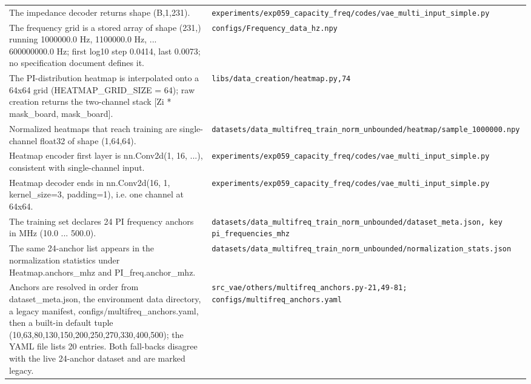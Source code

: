 \begin{longtable}{p{} p{}}
The impedance decoder returns shape (B,1,231). & \texttt{experiments/\allowbreak{}exp059\_\allowbreak{}capacity\_\allowbreak{}freq/\allowbreak{}codes/\allowbreak{}vae\_\allowbreak{}multi\_\allowbreak{}input\_\allowbreak{}simple.py} \\
The frequency grid is a stored array of shape (231,) running 1000000.0 Hz, 1100000.0 Hz, ... 600000000.0 Hz; first log10 step 0.0414, last 0.0073; no specification document defines it. & \texttt{configs/\allowbreak{}Frequency\_\allowbreak{}data\_\allowbreak{}hz.npy} \\
The PI-distribution heatmap is interpolated onto a 64x64 grid (HEATMAP\_GRID\_SIZE = 64); raw creation returns the two-channel stack [Zi * mask\_board, mask\_board]. & \texttt{libs/\allowbreak{}data\_\allowbreak{}creation/\allowbreak{}heatmap.py,74} \\
Normalized heatmaps that reach training are single-channel float32 of shape (1,64,64). & \texttt{datasets/\allowbreak{}data\_\allowbreak{}multifreq\_\allowbreak{}train\_\allowbreak{}norm\_\allowbreak{}unbounded/\allowbreak{}heatmap/\allowbreak{}sample\_\allowbreak{}1000000.npy} \\
Heatmap encoder first layer is nn.Conv2d(1, 16, ...), consistent with single-channel input. & \texttt{experiments/\allowbreak{}exp059\_\allowbreak{}capacity\_\allowbreak{}freq/\allowbreak{}codes/\allowbreak{}vae\_\allowbreak{}multi\_\allowbreak{}input\_\allowbreak{}simple.py} \\
Heatmap decoder ends in nn.Conv2d(16, 1, kernel\_size=3, padding=1), i.e. one channel at 64x64. & \texttt{experiments/\allowbreak{}exp059\_\allowbreak{}capacity\_\allowbreak{}freq/\allowbreak{}codes/\allowbreak{}vae\_\allowbreak{}multi\_\allowbreak{}input\_\allowbreak{}simple.py} \\
The training set declares 24 PI frequency anchors in MHz (10.0 ... 500.0). & \texttt{datasets/\allowbreak{}data\_\allowbreak{}multifreq\_\allowbreak{}train\_\allowbreak{}norm\_\allowbreak{}unbounded/\allowbreak{}dataset\_\allowbreak{}meta.json, key pi\_\allowbreak{}frequencies\_\allowbreak{}mhz} \\
The same 24-anchor list appears in the normalization statistics under Heatmap.anchors\_mhz and PI\_freq.anchor\_mhz. & \texttt{datasets/\allowbreak{}data\_\allowbreak{}multifreq\_\allowbreak{}train\_\allowbreak{}norm\_\allowbreak{}unbounded/\allowbreak{}normalization\_\allowbreak{}stats.json} \\
Anchors are resolved in order from dataset\_meta.json, the environment data directory, a legacy manifest, configs/multifreq\_anchors.yaml, then a built-in default tuple (10,63,80,130,150,200,250,270,330,400,500); the YAML file lists 20 entries. Both fall-backs disagree with the live 24-anchor dataset and are marked legacy. & \texttt{src\_\allowbreak{}vae/\allowbreak{}others/\allowbreak{}multifreq\_\allowbreak{}anchors.py-21,49-81; configs/\allowbreak{}multifreq\_\allowbreak{}anchors.yaml} \\

\end{longtable}
